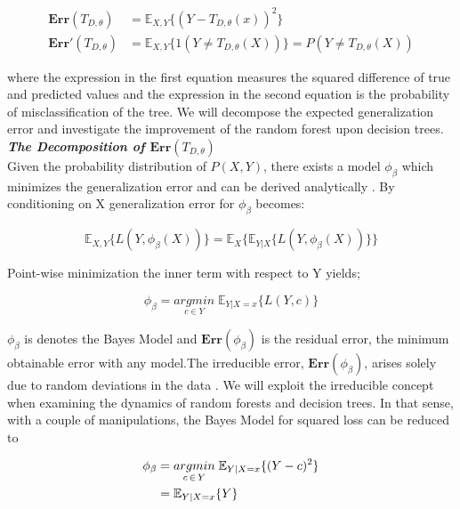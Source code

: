 \begin{align}
	\boldsymbol{Err}(T_{D,\theta}) & = \mathbb{E}_{X,Y}\{ (Y - T_{D, \theta}(x))^2 \} \\
	\boldsymbol{Err'}(T_{D,\theta}) & = \mathbb{E}_{X,Y}\{ 1(Y \neq T_{D, \theta}(X)) \}
	= P(Y \neq T_{D, \theta}(X))
\end{align}

where the expression in the first equation measures the squared difference of true and predicted values
and the expression in the second equation is the probability of misclassification of the tree. 
We will decompose the expected generalization error and investigate the improvement of the random forest upon 
decision trees.
\vspace{2mm}
\\
\textbf{\emph{The Decomposition of $\boldsymbol{Err}(T_{D,\theta})$}}\\
Given the probability distribution of $P(X,Y)$, there exists a model $\phi_{\beta}$ which minimizes the generalization error 
and can be derived analytically \cite{louppe2014understanding}. 
By conditioning on X generalization error for $\phi_{\beta}$ becomes:

\begin{equation}
\mathbb{E}_{X,Y} \{L(Y, \phi_{\beta}(X))\} = \mathbb{E}_{X}\{\mathbb{E}_{Y|X}\{L(Y, \phi_{\beta}(X)) \} \}
\end{equation}

Point-wise minimization the inner term with respect to Y yields;

\begin{equation}
\phi_{\beta} = \underset{c \in Y}{argmin} \; \mathbb{E}_{Y|X=x}\{L(Y,c)\}
\end{equation}

$\phi_{\beta}$ is denotes the Bayes Model and $\boldsymbol{Err}(\phi_{\beta})$ is the residual error, 
the minimum obtainable error with any model.The irreducible error, $\boldsymbol{Err}(\phi_{\beta})$, arises solely 
due to random deviations in the 
data \cite{louppe2014understanding}. We will exploit the irreducible concept when examining the dynamics of random forests and 
decision trees. In that sense, with a couple of manipulations, the Bayes Model for squared loss can be reduced to

\begin{align}\label{eq:bayes_eq_y}
\phi_{\beta} & = \underset{c \,\in\, Y}{argmin} \; \mathbb{E}_{Y|X=x}\{(Y-c)^2 \} \notag\\
			 & = \mathbb{E}_{Y|X=x}\{Y\}
\end{align}

